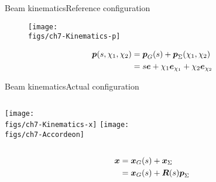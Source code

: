 \begin{frame}{Beam kinematics}{Reference configuration}

\begin{figure}
\centering\texttt{[image: \\figs/ch7-Kinematics-p]}
\end{figure}

\begin{displaymath}
\begin{split}
{\boldsymbol{p}}(s,\chi_1,\chi_2) &={\boldsymbol{p}}_G(s)+{\boldsymbol{p}}_\Sigma(\chi_1,\chi_2) \\
&= s{\boldsymbol{e}}+\chi_1{\boldsymbol{e}}_{\chi_1}+\chi_2{\boldsymbol{e}}_{\chi_2}
\end{split}
\end{displaymath}

\end{frame}

\begin{frame}{Beam kinematics}{Actual configuration}

\vskip-10pt
\begin{columns}
\centering\texttt{[image: \\figs/ch7-Kinematics-x]}
\centering\texttt{[image: \\figs/ch7-Accordeon]}
\end{columns}

\begin{displaymath}
\begin{split}
{\boldsymbol{x}} &={\boldsymbol{x}}_G(s)+{\boldsymbol{x}}_\Sigma \\
&= {\boldsymbol{x}}_G(s)+{\boldsymbol R}(s){\boldsymbol{p}}_\Sigma
\end{split}
\end{displaymath}

\end{frame}

